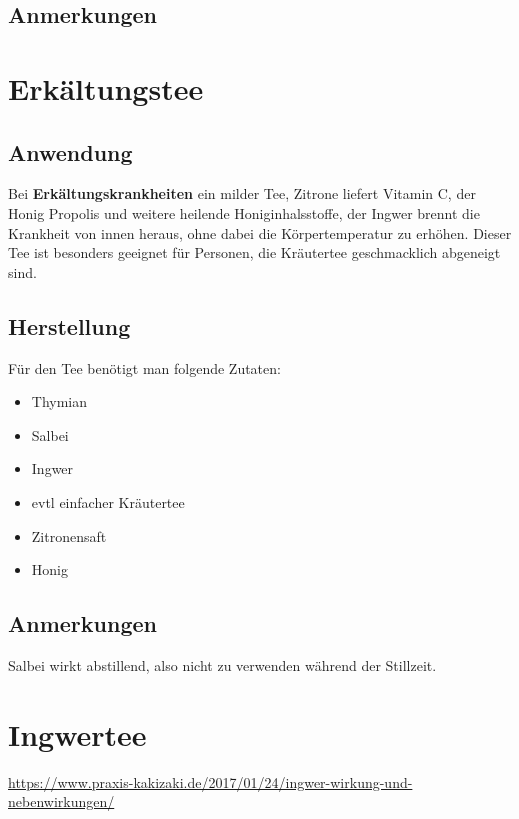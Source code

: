 \subsection{Anmerkungen}




\section{Erkältungstee}


\subsection{Anwendung}

Bei \textbf{Erkältungskrankheiten} ein milder Tee, Zitrone liefert Vitamin C, der Honig Propolis und weitere heilende Honiginhalsstoffe, der Ingwer brennt die Krankheit von innen heraus, ohne dabei die Körpertemperatur zu erhöhen. Dieser Tee ist besonders geeignet für Personen, die Kräutertee geschmacklich abgeneigt sind.

\subsection{Herstellung}

Für den Tee benötigt man folgende Zutaten:

\begin{itemize}
	\item Thymian
	\item Salbei
	\item Ingwer
	\item evtl einfacher Kräutertee
	\item Zitronensaft
	\item Honig
\end{itemize}


\subsection{Anmerkungen}

Salbei wirkt abstillend, also nicht zu verwenden während der Stillzeit.




\section{Ingwertee}

\url{https://www.praxis-kakizaki.de/2017/01/24/ingwer-wirkung-und-nebenwirkungen/}

